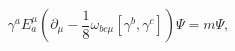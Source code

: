 \begin{equation}
\gamma ^{a}E_{a}^{\mu }\left( \partial _{\mu }-\frac{1}{8}\omega
_{bc\mu }
\left[ \gamma ^{b},\gamma ^{c}\right] \right) \Psi =m\Psi ,
\label{DE}
\end{equation}

